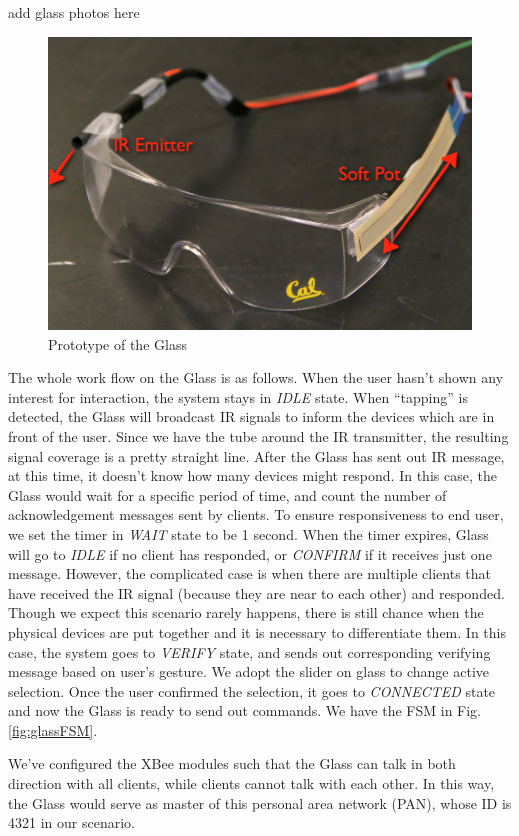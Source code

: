 {\color{red} add glass photos here}
\begin{figure}
  \centering
  \includegraphics[width=0.85\linewidth]{../figs/glass.png}
  \caption{Prototype of the Glass}
  \label{fig:glass}
\end{figure}


The whole work flow on the Glass is as follows. When the user hasn't shown any interest for interaction, the system stays in {\it IDLE} state. When ``tapping'' is detected, the Glass will broadcast IR signals to inform the devices which are in front of the user. Since we have the tube around the IR transmitter, the resulting signal coverage is a pretty straight line. After the Glass has sent out IR message, at this time, it doesn't know how many devices might respond. In this case, the Glass would wait for a specific period of time, and count the number of acknowledgement messages sent by clients. To ensure responsiveness to end user, we set the timer in {\it WAIT} state to be 1 second. When the timer expires, Glass will go to {\it IDLE} if no client has responded, or {\it CONFIRM} if it receives just one message. However, the complicated case is when there are multiple clients that have received the IR signal (because they are near to each other) and responded. Though we expect this scenario rarely happens, there is still chance when the physical devices are put together and it is necessary to differentiate them. In this case, the system goes to {\it VERIFY} state, and sends out corresponding verifying message based on user's gesture. We adopt the slider on glass to change active selection. Once the user confirmed the selection, it goes to {\it CONNECTED} state and now the Glass is ready to send out commands. We have the FSM in Fig.\,\ref{fig:glassFSM}.

We've configured the XBee modules such that the Glass can talk in both direction with all clients, while clients cannot talk with each other. In this way, the Glass would serve as master of this personal area network (PAN), whose ID is 4321 in our scenario. 


